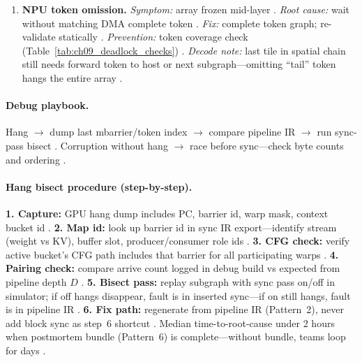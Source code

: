 \begin{enumerate}
\item \textbf{NPU token omission.}
\emph{Symptom:} array frozen mid-layer \citep{amd2024xdna,amd2024aie}.
\emph{Root cause:} wait without matching DMA complete token \citep{yirage2026}.
\emph{Fix:} complete token graph; re-validate statically \citep{wu2024mirage,chen2020compilerbasedhardw}.
\emph{Prevention:} token coverage check (Table~\ref{tab:ch09_deadlock_checks}) \citep{amd2024xdna,yirage2026}.
\emph{Decode note:} last tile in spatial chain still needs forward token to host or next subgraph---omitting ``tail'' token hangs the entire array \citep{amd2024aie,patel2025llminference}.
\end{enumerate}

\paragraph{Debug playbook.}
Hang $\rightarrow$ dump last mbarrier/token index $\rightarrow$ compare pipeline IR $\rightarrow$ run sync-pass bisect \citep{shah2024flashattention3,yirage2026,taxbreak2026,memoryfloor2026}.
Corruption without hang $\rightarrow$ race before sync---check byte counts and ordering \citep{semianalysis2024tma,dao2022flashattention,nvidia2022hopper}.

\paragraph{Hang bisect procedure (step-by-step).}
\textbf{1. Capture:} GPU hang dump includes PC, barrier id, warp mask, context bucket id \citep{nvidia2022hopper,shah2024flashattention3}.
\textbf{2. Map id:} look up barrier id in sync IR export---identify stream (weight vs KV), buffer slot, producer/consumer role ids \citep{yirage2026,semianalysis2024tma}.
\textbf{3. CFG check:} verify active bucket's CFG path includes that barrier for all participating warps \citep{nvidia2024cudagraphs,patel2025llminference}.
\textbf{4. Pairing check:} compare arrive count logged in debug build vs expected from pipeline depth $D$ \citep{dao2022flashattention,chen2020compilerbasedhardw}.
\textbf{5. Bisect pass:} replay subgraph with sync pass on/off in simulator; if off hangs disappear, fault is in inserted sync---if on still hangs, fault is in pipeline IR \citep{wu2024mirage,yirage2026,mpk2025}.
\textbf{6. Fix path:} regenerate from pipeline IR (Pattern~2), never add block sync as step~6 shortcut \citep{taxbreak2026,patel2025llminference}.
Median time-to-root-cause under 2 hours when postmortem bundle (Pattern~6) is complete---without bundle, teams loop for days \citep{shah2024flashattention3,memoryfloor2026}.

